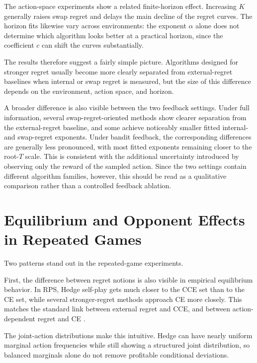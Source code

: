 The action-space experiments show a related finite-horizon effect. Increasing
\(K\) generally raises swap regret and delays the main decline of the regret
curves. The horizon fits likewise vary across environments: the exponent
\(\alpha\) alone does not determine which algorithm looks better at a practical
horizon, since the coefficient \(c\) can shift the curves substantially.

The results therefore suggest a fairly simple picture. Algorithms designed for
stronger regret usually become more clearly separated from external-regret
baselines when internal or swap regret is measured, but the size of this
difference depends on the environment, action space, and horizon.

A broader difference is also visible between the two feedback settings.
Under full information, several swap-regret-oriented methods show clearer
separation from the external-regret baseline, and some achieve noticeably
smaller fitted internal- and swap-regret exponents. Under bandit feedback, the
corresponding differences are generally less pronounced, with most fitted
exponents remaining closer to the root-$T$ scale. This is consistent with the
additional uncertainty introduced by observing only the reward of the sampled
action. Since the two settings contain different algorithm families, however,
this should be read as a qualitative comparison rather than a controlled
feedback ablation.

\section{Equilibrium and Opponent Effects in Repeated Games}
\label{sec:discussion-games}

Two patterns stand out in the repeated-game experiments.

First, the difference between regret notions is also visible in empirical
equilibrium behavior. In RPS, Hedge self-play gets much closer to the CCE set
than to the CE set, while several stronger-regret methods approach CE more
closely. This matches the standard link between external regret and CCE, and
between action-dependent regret and CE
\citep{hart_simple_2000,blum_external_2007}.

The joint-action distributions make this intuitive. Hedge can have nearly
uniform marginal action frequencies while still showing a structured joint
distribution, so balanced marginals alone do not remove profitable conditional
deviations.


